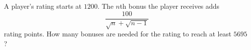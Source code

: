 A player's rating starts at $1200$. The $n$th bonus the player receives adds
\[\dfrac{100}{\sqrt n+\sqrt{n-1}}\]
rating points. How many bonuses are needed for the rating to reach at least $5695$?
